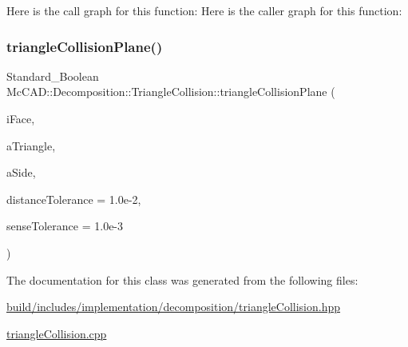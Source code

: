 Here is the call graph for this function\+:
Here is the caller graph for this function\+:
\mbox{\label{classMcCAD_1_1Decomposition_1_1TriangleCollision_aa9f5d8a29c70ea403e8a690108c31cc7}} 
\subsubsection{\texorpdfstring{triangle\+Collision\+Plane()}{triangleCollisionPlane()}\hspace{0.1cm}{\footnotesize\ttfamily [2/2]}}
{\footnotesize\ttfamily Standard\+\_\+\+Boolean Mc\+C\+A\+D\+::\+Decomposition\+::\+Triangle\+Collision\+::triangle\+Collision\+Plane (\begin{DoxyParamCaption}\item[{const \hyperlink{classMcCAD_1_1Geometry_1_1BoundSurface}{Mc\+C\+A\+D\+::\+Geometry\+::\+Bound\+Surface} \&}]{i\+Face,  }\item[{const \hyperlink{classMcCAD_1_1Geometry_1_1MeshTriangle}{Mc\+C\+A\+D\+::\+Geometry\+::\+Mesh\+Triangle} \&}]{a\+Triangle,  }\item[{Standard\+\_\+\+Integer \&}]{a\+Side,  }\item[{Standard\+\_\+\+Real}]{distance\+Tolerance = {\ttfamily 1.0e-\/2},  }\item[{Standard\+\_\+\+Real}]{sense\+Tolerance = {\ttfamily 1.0e-\/3} }\end{DoxyParamCaption})\hspace{0.3cm}{\ttfamily [private]}}



The documentation for this class was generated from the following files\+:\begin{DoxyCompactItemize}
\item 
\hyperlink{build_2includes_2implementation_2decomposition_2triangleCollision_8hpp}{build/includes/implementation/decomposition/triangle\+Collision.\+hpp}\item 
\hyperlink{triangleCollision_8cpp}{triangle\+Collision.\+cpp}\end{DoxyCompactItemize}
